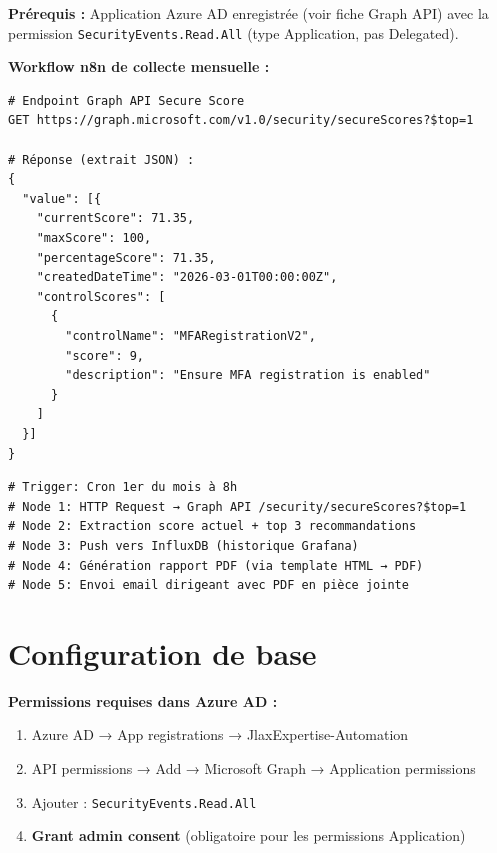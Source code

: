 \documentclass[11pt, a4paper]{article}
\begin{document}
\textbf{Prérequis :} Application Azure AD enregistrée (voir fiche Graph API) avec la permission \texttt{SecurityEvents.Read.All} (type Application, pas Delegated).

\textbf{Workflow n8n de collecte mensuelle :}
\begin{lstlisting}[style=terminal, caption={Appel API Graph — Secure Score}]
# Endpoint Graph API Secure Score
GET https://graph.microsoft.com/v1.0/security/secureScores?$top=1

# Réponse (extrait JSON) :
{
  "value": [{
    "currentScore": 71.35,
    "maxScore": 100,
    "percentageScore": 71.35,
    "createdDateTime": "2026-03-01T00:00:00Z",
    "controlScores": [
      {
        "controlName": "MFARegistrationV2",
        "score": 9,
        "description": "Ensure MFA registration is enabled"
      }
    ]
  }]
}
\end{lstlisting}

\begin{lstlisting}[style=yamlstyle, caption={Workflow n8n — collecte et rapport mensuel (structure)}]
# Trigger: Cron 1er du mois à 8h
# Node 1: HTTP Request → Graph API /security/secureScores?$top=1
# Node 2: Extraction score actuel + top 3 recommandations
# Node 3: Push vers InfluxDB (historique Grafana)
# Node 4: Génération rapport PDF (via template HTML → PDF)
# Node 5: Envoi email dirigeant avec PDF en pièce jointe
\end{lstlisting}

\section{Configuration de base}

\textbf{Permissions requises dans Azure AD :}
\begin{enumerate}
  \item Azure AD → App registrations → JlaxExpertise-Automation
  \item API permissions → Add → Microsoft Graph → Application permissions
  \item Ajouter : \texttt{SecurityEvents.Read.All}
  \item \textbf{Grant admin consent} (obligatoire pour les permissions Application)
\end{enumerate}
\end{document}
